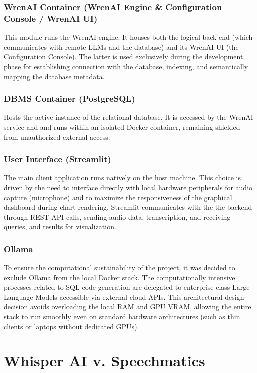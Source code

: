 \documentclass{article}
\begin{document}
\subsubsection{WrenAI Container (WrenAI Engine \& Configuration Console / WrenAI UI)}
This module runs the WrenAI engine. It houses both the logical back-end (which communicates with remote LLMs and the database) and its WrenAI UI (the Configuration Console). The latter is used exclusively during the development phase for establishing connection with the database, indexing, and semantically mapping the database metadata.

\subsubsection{DBMS Container (PostgreSQL)}
Hosts the active instance of the relational database. It is accessed by the WrenAI service and  and runs within an isolated Docker container, remaining shielded from unauthorized external access.

\subsubsection{User Interface (Streamlit)}
The main client application runs natively on the host machine. This choice is driven by the need to interface directly with local hardware peripherals for audio capture (microphone) and to maximize the responsiveness of the graphical dashboard during chart rendering. Streamlit communicates with the the backend through REST API calls, sending audio data, transcription, and receiving queries, and results for visualization.

\subsubsection*{Ollama}
To ensure the computational sustainability of the project, it was decided to exclude Ollama from the local Docker stack. The computationally intensive processes related to SQL code generation are delegated to enterprise-class Large Language Models accessible via external cloud APIs. This architectural design decision avoids overloading the local RAM and GPU VRAM, allowing the entire stack to run smoothly even on standard hardware architectures (such as thin clients or laptops without dedicated GPUs).

\section{Whisper AI v. Speechmatics}
\end{document}

